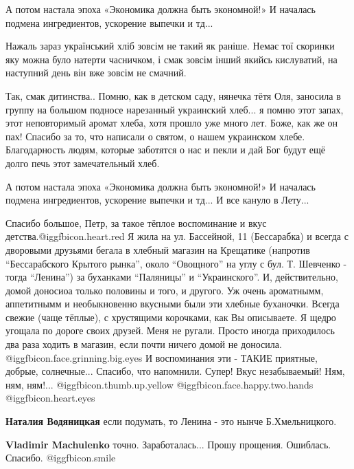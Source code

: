 \begin{itemize}

А потом настала эпоха «Экономика должна быть экономной!» И началась подмена
ингредиентов, ускорение выпечки и тд...



Нажаль зараз український хліб зовсім не такий як раніше. Немає тої скоринки яку
можна було натерти часничком, і смак зовсім інший якийсь кислуватий, на
наступний день він вже зовсім не смачний.

Так, смак дитинства..
Помню, как в детском саду, нянечка тётя Оля, заносила в группу на большом подносе нарезанный украинский хлеб... я помню этот запах, этот неповторимый аромат хлеба, хотя прошло уже много лет. Боже, как же он пах!
Спасибо за то, что написали о святом, о нашем украинском хлебе.
Благодарность людям, которые заботятся о нас и пекли и дай Бог будут ещё долго печь этот замечательный хлеб.

А потом настала эпоха «Экономика должна быть экономной!» И началась подмена ингредиентов, ускорение выпечки и тд...
И все кануло в Лету...


Спасибо большое, Петр, за такое тёплое воспоминание и вкус
детства.@igg{fbicon.heart.red} Я жила на ул. Бассейной, 11 (Бессарабка) и
всегда с дворовыми друзьями бегала в хлебный магазин на Крещатике (напротив
\enquote{Бессарабского Крытого рынка}, около \enquote{Овощного} на углу с бул.
Т. Шевченко - тогда \enquote{Ленина}) за буханками \enquote{Паляницы} и
\enquote{Украинского}. И, действительно, домой доносиоа только половины и того,
и другого. Уж очень ароматнымм, аппетитнымм и необыкновенно вкусными были эти
хлебные буханочки. Всегда свежие (чаще тёплые), с хрустящими корочками, как Вы
описываете. Я щедро угощала по дороге своих друзей. Меня не ругали. Просто
иногда приходилось два раза ходить в магазин, если почти ничего домой не
доносила. @igg{fbicon.face.grinning.big.eyes}  И воспоминания эти - ТАКИЕ
приятные, добрые, солнечные... Спасибо, что напомнили. Супер! Вкус
незабываемый! Ням, ням, ням!... @igg{fbicon.thumb.up.yellow}
@igg{fbicon.face.happy.two.hands}  @igg{fbicon.heart.eyes}

\begin{itemize} %
\textbf{Наталия Водяницкая} если подумать, то Ленина - это нынче Б.Хмельницкого.

\begin{itemize} %
\textbf{Vladimir Machulenko} точно. Заработалась... Прошу прощения. Ошиблась. Спасибо. @igg{fbicon.smile} 


\end{itemize}
\end{itemize}
\end{itemize}
